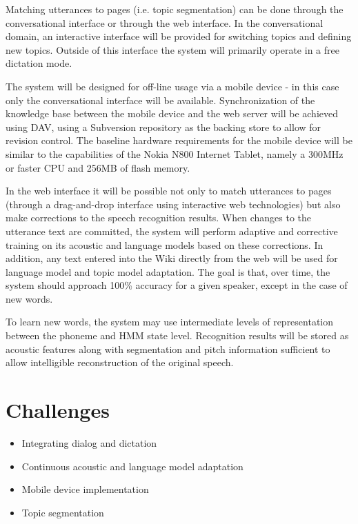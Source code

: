 \documentclass{article}
\begin{document}
Matching utterances to pages (i.e. topic segmentation) can be done
through the conversational interface or through the web interface.  In
the conversational domain, an interactive interface will be provided
for switching topics and defining new topics.  Outside of this
interface the system will primarily operate in a free dictation mode.  

The system will be designed for off-line usage via a mobile device -
in this case only the conversational interface will be available.
Synchronization of the knowledge base between the mobile device and
the web server will be achieved using DAV, using a Subversion
repository as the backing store to allow for revision control.  The
baseline hardware requirements for the mobile device will be similar
to the capabilities of the Nokia N800 Internet Tablet, namely a 300MHz
or faster CPU and 256MB of flash memory.

In the web interface it will be possible not only to match utterances
to pages (through a drag-and-drop interface using interactive web
technologies) but also make corrections to the speech recognition
results.  When changes to the utterance text are committed, the system
will perform adaptive and corrective training on its acoustic and
language models based on these corrections.  In addition, any text
entered into the Wiki directly from the web will be used for language
model and topic model adaptation.  The goal is that, over time, the
system should approach 100\% accuracy for a given speaker, except in
the case of new words.

To learn new words, the system may use intermediate levels of
representation between the phoneme and HMM state level.  Recognition
results will be stored as acoustic features along with segmentation
and pitch information sufficient to allow intelligible reconstruction
of the original speech.

\section{Challenges}
\label{sec:challenges}

\begin{itemize}
\item Integrating dialog and dictation
\item Continuous acoustic and language model adaptation
\item Mobile device implementation
\item Topic segmentation
\end{itemize}
\end{document}
